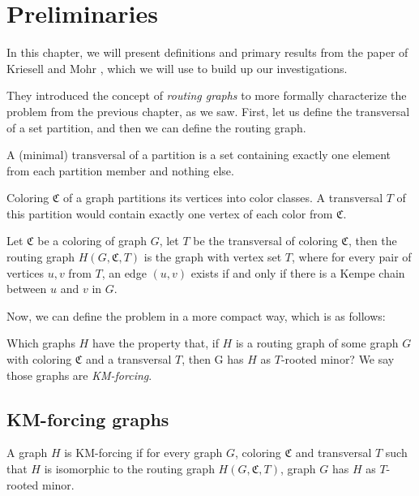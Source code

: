 \chapter{Preliminaries}

In this chapter, we will present definitions and primary results from the paper of 
Kriesell and Mohr \cite{matthias_2022}, which we will use to build up our investigations.

They introduced the concept of \textit{routing graphs} to more formally characterize the problem from the previous chapter, as we saw. 
First, let us define the transversal of a set partition, and then we can define the routing graph.

\begin{defn}
 A (minimal) transversal of a partition is a set containing exactly one
 element from each partition member and nothing else.
\end{defn}

\begin{example}
 Coloring $\mathfrak{C}$ of a graph partitions its vertices into color classes. 
 A transversal $T$ of this partition would contain exactly one vertex of each color from $\mathfrak{C}$.
\end{example}

\begin{defn}
Let $\mathfrak{C}$ be a coloring of graph $G$, let $T$ be the transversal of coloring $\mathfrak{C}$, 
then the routing graph $H(G, \mathfrak{C}, T)$ is the graph with vertex set $T$,
where for every pair of vertices $u,v$ from $T$, an edge $(u,v)$ exists if and only if
there is a Kempe chain between $u$ and $v$ in $G$.
\end{defn}

Now, we can define the problem in a more compact way, which is as follows:

Which graphs $H$ have the property that, if $H$ is a
routing graph of some graph $G$ with coloring $\mathfrak{C}$ and a transversal $T$, then G
has $H$ as $T$-rooted minor? We say those graphs are \textit{KM-forcing}.

\section{KM-forcing graphs}

\begin{defn}[KM-forcing]
 A graph $H$ is KM-forcing if for every graph $G$, coloring $\mathfrak{C}$ and transversal $T$
 such that $H$ is isomorphic to the routing graph $H(G, \mathfrak{C}, T)$, graph $G$ has $H$ as $T$-rooted minor.
\end{defn}

